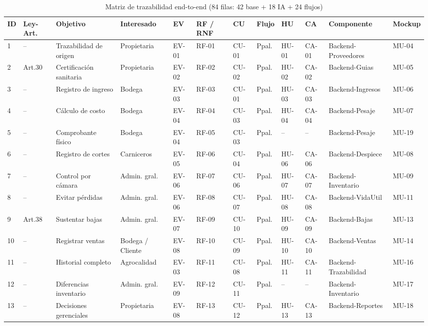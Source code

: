 \documentclass[11pt,a4paper]{article}
\begin{document}
\scriptsize
\setlength{\tabcolsep}{2.2pt}
\begin{longtable}{|p{0.3cm}|p{1.0cm}|p{1.9cm}|p{1.3cm}|p{0.6cm}|p{0.7cm}|p{0.6cm}|p{1.1cm}|p{0.6cm}|p{0.6cm}|p{2.0cm}|p{0.8cm}|}
\caption{Matriz de trazabilidad end-to-end (84 filas: 42 base + 18 IA + 24 flujos)}\\
\hline
\textbf{ID} & \textbf{Ley-Art.} & \textbf{Objetivo} & \textbf{Interesado} & \textbf{EV} & \textbf{RF / RNF} & \textbf{CU} & \textbf{Flujo} & \textbf{HU} & \textbf{CA} & \textbf{Componente} & \textbf{Mockup} \\
\hline
1 & -- & Trazabilidad de origen & Propietaria & EV-01 & RF-01 & CU-01 & Ppal. & HU-01 & CA-01 & Backend-Proveedores & MU-04 \\
2 & Art.30 & Certificación sanitaria & Propietaria & EV-02 & RF-02 & CU-02 & Ppal. & HU-02 & CA-02 & Backend-Guias & MU-05 \\
3 & -- & Registro de ingreso & Bodega & EV-03 & RF-03 & CU-01 & Ppal. & HU-03 & CA-03 & Backend-Ingresos & MU-06 \\
4 & -- & Cálculo de costo & Bodega & EV-04 & RF-04 & CU-03 & Ppal. & HU-04 & CA-04 & Backend-Pesaje & MU-07 \\
5 & -- & Comprobante físico & Bodega & EV-04 & RF-05 & CU-03 & Ppal. & -- & -- & Backend-Pesaje & MU-19 \\
6 & -- & Registro de cortes & Carniceros & EV-05 & RF-06 & CU-04 & Ppal. & HU-06 & CA-06 & Backend-Despiece & MU-08 \\
7 & -- & Control por cámara & Admin. gral. & EV-06 & RF-07 & CU-06 & Ppal. & HU-07 & CA-07 & Backend-Inventario & MU-09 \\
8 & -- & Evitar pérdidas & Admin. gral. & EV-06 & RF-08 & CU-07 & Ppal. & HU-08 & CA-08 & Backend-VidaUtil & MU-11 \\
9 & Art.38 & Sustentar bajas & Admin. gral. & EV-07 & RF-09 & CU-10 & Ppal. & HU-09 & CA-09 & Backend-Bajas & MU-13 \\
10 & -- & Registrar ventas & Bodega / Cliente & EV-08 & RF-10 & CU-09 & Ppal. & HU-10 & CA-10 & Backend-Ventas & MU-14 \\
11 & -- & Historial completo & Agrocalidad & EV-03 & RF-11 & CU-08 & Ppal. & HU-11 & CA-11 & Backend-Trazabilidad & MU-16 \\
12 & -- & Diferencias inventario & Admin. gral. & EV-09 & RF-12 & CU-11 & Ppal. & -- & -- & Backend-Inventario & MU-17 \\
13 & -- & Decisiones gerenciales & Propietaria & EV-08 & RF-13 & CU-12 & Ppal. & HU-13 & CA-13 & Backend-Reportes & MU-18 \\

\end{longtable}
\end{document}
